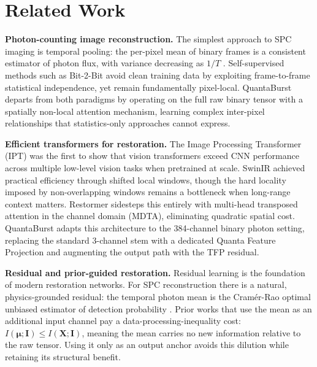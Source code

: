 \documentclass[10pt,twocolumn,letterpaper]{article}
\newcommand{\Igt}{\mathbf{I}}
\newcommand{\vX}{\mathbf{X}}
\newcommand{\bmu}{\boldsymbol{\mu}}
\begin{document}
\section{Related Work}

\noindent\textbf{Photon-counting image reconstruction.}
The simplest approach to SPC imaging is temporal pooling: the
per-pixel mean of binary frames is a consistent estimator of photon
flux, with variance decreasing as $1/T$
\cite{ma2020quanta,gnanasambandam2020}.
Self-supervised methods such as Bit-2-Bit \cite{chan2022bit2bit}
avoid clean training data by exploiting frame-to-frame statistical
independence, yet remain fundamentally pixel-local.
QuantaBurst departs from both paradigms by operating on the full
raw binary tensor with a spatially non-local attention mechanism,
learning complex inter-pixel relationships that statistics-only
approaches cannot express.

\noindent\textbf{Efficient transformers for restoration.}
The Image Processing Transformer (IPT) \cite{chen2021pre} was the
first to show that vision transformers exceed CNN performance across
multiple low-level vision tasks when pretrained at scale.
SwinIR \cite{liang2021swinir} achieved practical efficiency through
shifted local windows, though the hard locality imposed by
non-overlapping windows remains a bottleneck when long-range
context matters.
Restormer \cite{zamir2022restormer} sidesteps this entirely with
multi-head transposed attention in the channel domain (MDTA),
eliminating quadratic spatial cost.
QuantaBurst adapts this architecture to the 384-channel binary
photon setting, replacing the standard 3-channel stem with a
dedicated Quanta Feature Projection and augmenting the output
path with the TFP residual.

\noindent\textbf{Residual and prior-guided restoration.}
Residual learning \cite{he2016deep} is the foundation of modern
restoration networks.
For SPC reconstruction there is a natural, physics-grounded residual:
the temporal photon mean is the Cram\'{e}r-Rao optimal unbiased
estimator of detection probability \cite{gnanasambandam2020}.
Prior works that use the mean as an additional input channel pay a
data-processing-inequality cost: $I(\bmu;\Igt) \le I(\vX;\Igt)$,
meaning the mean carries no new information relative to the raw
tensor.  Using it only as an output anchor avoids this dilution
while retaining its structural benefit.
\end{document}
